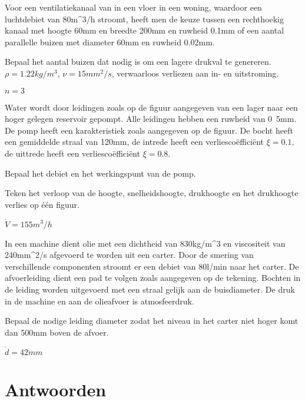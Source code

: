 \begin{toepassing}
	\label{ventilatiekanaal}
	Voor een ventilatiekanaal van in een vloer in een woning, waardoor een luchtdebiet van \unit{80}{m^3/h} stroomt, heeft men de keuze tussen een rechthoekig kanaal met hoogte 60mm en breedte 200mm en ruwheid 0.1mm of een aantal parallelle buizen met diameter 60mm en ruwheid 0.02mm. 
		
	Bepaal het aantal buizen dat nodig is om een lagere drukval te genereren. $\rho = \unit{1.22}{kg/m^3}$, $\nu = \unit{15}{mm^2/s}$, verwaarloos verliezen aan in- en uitstroming.
\end{toepassing}
\begin{antwoord}
	$n = 3$
\end{antwoord}
\begin{toepassing*}
	\label{pompopvoerhoogte}
	Water wordt door leidingen zoals op de figuur aangegeven van een lager naar een hoger gelegen reservoir gepompt. Alle leidingen hebben een ruwheid van \unit{0.5}{mm}. De pomp heeft een karakteristiek zoals aangegeven op de figuur. De bocht heeft een gemiddelde straal van \unit{120}{mm}, de intrede heeft een verliescoëfficiënt $\xi = 0.1$, de uittrede heeft een verliesco\"effici\"ent $\xi = 0.8$.
		
	Bepaal het debiet en het werkingspunt van de pomp.
		
	Teken het verloop van de hoogte, snelheidshoogte, drukhoogte en het drukhoogte verlies op één figuur.
	\begin{center}
		
	\end{center}
\end{toepassing*}
\begin{antwoord}
	$\dot{V} = \unit{155}{m^3/h}$
\end{antwoord}
\begin{toepassing*}
	\label{olieafvoerdimensionering}
	In een machine dient olie met een dichtheid van \unit{830}{kg/m^3} en viscositeit van \unit{240}{mm^2/s} afgevoerd te worden uit een carter. Door de smering van verschillende componenten stroomt er een debiet van \unit{80}{l/min} naar het carter. De afvoerleiding dient een pad te volgen zoals aangegeven op de tekening. Bochten in de leiding worden uitgevoerd met een straal gelijk aan de buisdiameter. De druk in de machine en aan de olieafvoer is atmosfeerdruk.
	
	Bepaal de nodige leiding diameter zodat het niveau in het carter niet hoger komt dan 500mm boven de afvoer.
	\begin{center}
		
	\end{center}
\end{toepassing*}
\begin{antwoord}
	$\dot{d} = \unit{42}{mm}$
\end{antwoord}
	\section*{Antwoorden}
\begin{multicols}{2}
\end{multicols}